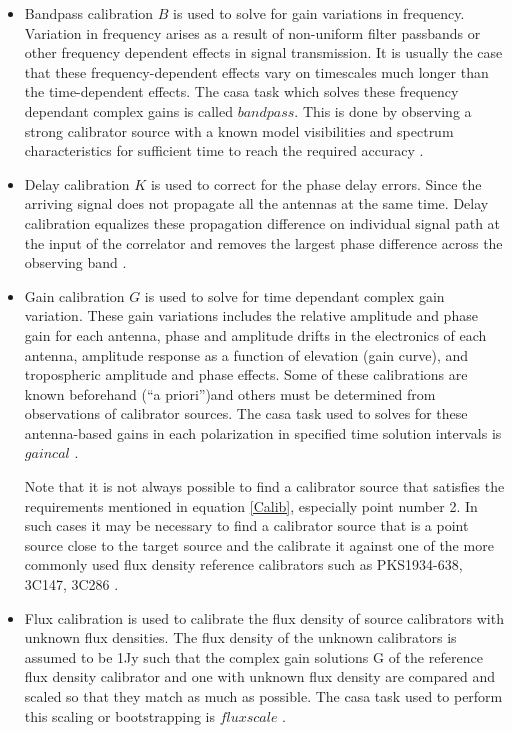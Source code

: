 \begin{itemize}

\item Bandpass calibration $B$ is used to solve for gain variations
in frequency. Variation in frequency arises as a result of non-uniform filter passbands or other frequency dependent effects in signal transmission. It is usually the case that these frequency-dependent effects vary on timescales much longer than the time-dependent effects. The casa task which solves these frequency dependant complex gains is called $\textit{bandpass}$. This is done by observing a strong calibrator source with a known model visibilities and spectrum characteristics for sufficient time to reach the required accuracy \citep{taylor1999synthesis}.

\item Delay calibration $K$ is used to correct for the phase delay errors. Since the arriving signal does not propagate all the antennas at the same time. Delay calibration equalizes these propagation difference on individual signal path at the input of the correlator and removes the largest phase difference across the observing band \citep{taylor1999synthesis}.   

\item Gain calibration $G$ is used to solve for time dependant complex gain variation. These gain variations includes the relative amplitude and phase gain for each antenna, phase and amplitude drifts in the electronics of each antenna, amplitude response as a function of elevation (gain curve), and tropospheric amplitude and phase effects. Some of these calibrations are known beforehand (“a priori”)and others must be determined from observations of calibrator sources. The casa task used to solves for these antenna-based gains in each polarization in specified time solution intervals  is $\textit{gaincal}$ \citep{editioncasa}.  

Note that it is not always possible to find a calibrator source that satisfies the requirements mentioned in equation \ref{Calib}, especially point number 2. In such cases it may be necessary to find a calibrator source that is a point source  close to the target source and the calibrate it against one of the more commonly used flux density reference calibrators such as PKS1934-638, 3C147, 3C286 \citep{thompson2001interferometry}. 

\item Flux calibration is used to calibrate the flux density of source calibrators with unknown flux densities. The flux density of the unknown calibrators is assumed to be 1Jy such that the complex gain solutions G of the reference flux density calibrator and one with unknown flux density are compared and scaled so that they match as much as possible. The casa task used to perform this scaling or bootstrapping is $\textit{fluxscale}$ \citep{editioncasa}.
\end{itemize}

